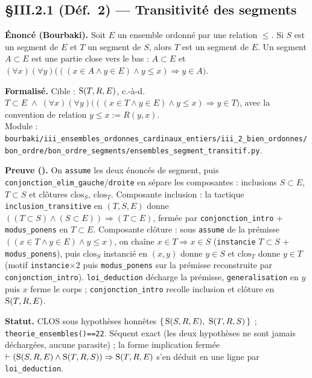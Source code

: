 \subsection{§III.2.1 (Déf.~2) --- Transitivité des segments}
\textbf{Énoncé (Bourbaki).} Soit $E$ un ensemble ordonné par une relation $\le$. Si $S$ est un segment de $E$ et $T$ un segment de $S$, alors $T$ est un segment de $E$. Un segment $A\subset E$ est une partie close vers le bas : $A\subset E$ et $(\forall x)(\forall y)\bigl(((x\in A \wedge y\in E)\wedge y\le x)\Rightarrow y\in A\bigr)$.

\textbf{Formalisé.} Cible : $\mathrm{S}(T,R,E)$, c.-à-d. $T\subset E \;\wedge\; (\forall x)(\forall y)\bigl(((x\in T\wedge y\in E)\wedge y\le x)\Rightarrow y\in T\bigr)$, avec la convention de relation $y\le x := R(y,x)$. \\
Module : \texttt{bourbaki/iii\_ensembles\_ordonnes\_cardinaux\_entiers/iii\_2\_bien\_ordonnes/bon\_ordre/bon\_ordre\_segments/ensembles\_segment\_transitif.py}.

\textbf{Preuve (\Nstar).} On \texttt{assume} les deux énoncés de segment, puis \texttt{conjonction\_elim\_gauche}/\texttt{droite} en sépare les composantes : inclusions $S\subset E$, $T\subset S$ et clôtures $\mathrm{clos}_S$, $\mathrm{clos}_T$. Composante inclusion : la tactique \texttt{inclusion\_transitive} en $(T,S,E)$ donne $((T\subset S)\wedge(S\subset E))\Rightarrow(T\subset E)$, fermée par \texttt{conjonction\_intro} + \texttt{modus\_ponens} en $T\subset E$. Composante clôture : sous \texttt{assume} de la prémisse $((x\in T\wedge y\in E)\wedge y\le x)$, on chaîne $x\in T \Rightarrow x\in S$ (\texttt{instancie} $T\subset S$ + \texttt{modus\_ponens}), puis $\mathrm{clos}_S$ instancié en $(x,y)$ donne $y\in S$ et $\mathrm{clos}_T$ donne $y\in T$ (motif \texttt{instancie}$\times 2$ puis \texttt{modus\_ponens} sur la prémisse reconstruite par \texttt{conjonction\_intro}). \texttt{loi\_deduction} décharge la prémisse, \texttt{generalisation} en $y$ puis $x$ ferme le corps ; \texttt{conjonction\_intro} recolle inclusion et clôture en $\mathrm{S}(T,R,E)$.

\textbf{Statut.} CLOS sous hypothèses honnêtes $\{\,\mathrm{S}(S,R,E),\ \mathrm{S}(T,R,S)\,\}$ ; \texttt{theorie\_ensembles()==22}. Séquent exact (les deux hypothèses ne sont jamais déchargées, aucune parasite) ; la forme implication fermée $\vdash (\mathrm{S}(S,R,E)\wedge\mathrm{S}(T,R,S))\Rightarrow\mathrm{S}(T,R,E)$ s'en déduit en une ligne par \texttt{loi\_deduction}.

